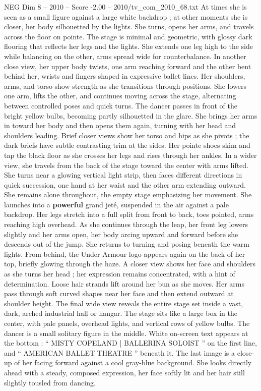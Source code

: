 \begin{textsample}{NEG Dim 8 – 2010 – Score -2.00 – 2010/tv\_com\_2010\_68.txt}
At times she is seen as a small figure against a large white backdrop ; at other moments she is closer, her body silhouetted by the lights.
She turns, opens her arms, and travels across the floor on pointe.
The stage is minimal and geometric, with glossy dark flooring that reflects her legs and the lights.
She extends one leg high to the side while balancing on the other, arms spread wide for counterbalance.
In another close view, her upper body twists, one arm reaching forward and the other bent behind her, wrists and fingers shaped in expressive ballet lines.
Her shoulders, arms, and torso show strength as she transitions through positions.
She lowers one arm, lifts the other, and continues moving across the stage, alternating between controlled poses and quick turns.
The dancer passes in front of the bright yellow bulbs, becoming partly silhouetted in the glare.
She brings her arms in toward her body and then opens them again, turning with her head and shoulders leading.
Brief closer views show her torso and hips as she pivots ; the dark briefs have subtle contrasting trim at the sides.
Her pointe shoes skim and tap the black floor as she crosses her legs and rises through her ankles.
In a wider view, she travels from the back of the stage toward the center with arms lifted.
She turns near a glowing vertical light strip, then faces different directions in quick succession, one hand at her waist and the other arm extending outward.
She remains alone throughout, the empty stage emphasizing her movement.
She launches into a \textbf{powerful} grand jeté, suspended in the air against a pale backdrop.
Her legs stretch into a full split from front to back, toes pointed, arms reaching high overhead.
As she continues through the leap, her front leg lowers slightly and her arms open, her body arcing upward and forward before she descends out of the jump.
She returns to turning and posing beneath the warm lights.
From behind, the Under Armour logo appears again on the back of her top, briefly glowing through the haze.
A closer view shows her face and shoulders as she turns her head ; her expression remains concentrated, with a hint of determination.
Loose hair strands lift around her bun as she moves.
Her arms pass through soft curved shapes near her face and then extend outward at shoulder height.
The final wide view reveals the entire stage set inside a vast, dark, arched industrial hall or hangar.
The stage sits like a large box in the center, with pale panels, overhead lights, and vertical rows of yellow bulbs.
The dancer is a small solitary figure in the middle.
White on-screen text appears at the bottom : “ MISTY COPELAND | BALLERINA SOLOIST ” on the first line, and “ AMERICAN BALLET THEATRE ” beneath it.
The last image is a close-up of her facing forward against a cool gray-blue background.
She looks directly ahead with a steady, composed expression, her face softly lit and her hair still slightly tousled from dancing.

\end{textsample}
